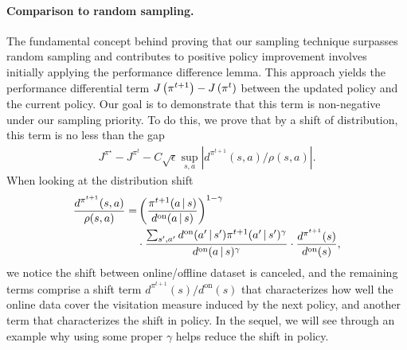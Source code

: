 \paragraph{Comparison to random sampling.} The fundamental concept behind proving that our sampling technique surpasses random sampling and contributes to positive policy improvement involves initially applying the performance difference lemma. 
This approach yields the performance differential term $J \left( {\pi^{t+1}} \right) -J \left( {\pi^t} \right) $ between the updated policy and the current policy.
Our goal is to demonstrate that this term is non-negative under our sampling priority. To do this, we prove that by a shift of distribution, this term is no less than the gap
\begin{align}
J^{\pi^\star} - J^{\pi^t} - C \sqrt \epsilon \sup_{s, a}  |  {d^{\pi^{t+1}}(s, a)} / {\rho(s, a)} |.
\end{align}
When looking at the distribution shift
\begin{align*}
    \frac{d^{\pi^{t+1}}(s, a)}{\rho(s, a)} =&\left(\frac{{\pi^{t+1}}(a{\,|\,} s)}{d^{\text{on}}(a{\,|\,} s)}\right)^{1-\gamma}  \notag \\
    &  \cdot \frac{\sum_{s', a'}d^{\text{on}}(a'{\,|\,} s') \pi^{t+1}(a'{\,|\,} s')^\gamma}{d^{\text{on}}(a{\,|\,} s)^\gamma} \cdot \frac{d^{\pi^{t+1}}(s)}{d^{\text{on}}(s)},
\end{align*} 
we notice the shift between online/offline dataset is canceled, and the remaining terms comprise a shift term $ {d^{\pi^{t+1}}(s)}/{d^{\text{on}}(s)}$ that characterizes how well the online data cover the visitation measure induced by the next policy, and another term that characterizes the shift in policy. In the sequel, we will see through an example why using some proper $\gamma$ helps reduce the shift in policy. 



